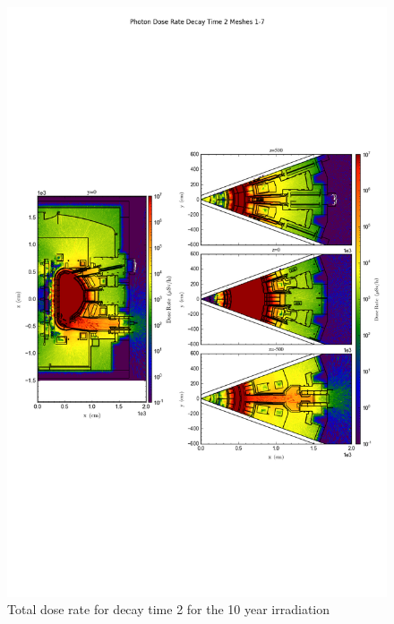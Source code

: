\documentclass[12pt]{article}
\begin{document}
\begin{figure}[ht!]
\centering
\includegraphics[trim={0cm 8cm, 0cm 8cm},clip,scale=0.75]{../plots/final_model_with_b4c/10year/Photon_Dose_Rate_Decay_Time_2_Meshes_1-7.png}
\caption{Total dose rate for decay time 2 for the 10 year irradiation}
\label{fig:photons_10y_dc2_nob4c_dose}
\end{figure}
\end{document}
